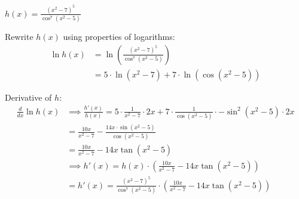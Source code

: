 \documentclass[nooutcomes]{ximera}
\renewenvironment{freeResponse}{
\ifhandout\setbox0\vbox\bgroup\else
\begin{trivlist}\item[\hskip \labelsep\bfseries Solution:\hspace{2ex}]
\fi}
{\ifhandout\egroup\else
\end{trivlist}
\fi}
\newcommand{\ddx}{\frac{d}{dx}}
\begin{document}
\begin{problem}
\begin{enumerate}
	\item  $h(x) = \frac{(x^2 - 7)^5}{\cos^7(x^2 - 5)}$
          \begin{freeResponse}
            Rewrite $h(x)$ using properties of logarithms:
            \begin{align*}
              \ln h(x) &= \ln \left( \frac{(x^2 - 7)^5}{\cos^7(x^2 - 5)}\right) \\
                       &= 5 \cdot \ln (x^2 - 7) + 7 \cdot \ln(\cos(x^2-5))
            \end{align*}

            Derivative of $h$:
            \begin{align*}
              \ddx \ln h(x) &\implies \frac{h'(x)}{h(x)} = 5 \cdot \frac{1}{x^2 - 7} \cdot 2x + 7 \cdot\frac{1}{\cos(x^2 - 5)} \cdot - \sin^2(x^2-5) \cdot 2x\\
                            &= \frac{10x}{x^2-7} - \frac{14x \cdot \sin(x^2 - 5)}{\cos(x^2 - 5)}\\
              &= \frac{10x}{x^2-7} - 14x \tan(x^2-5) \\
              &\implies h'(x) = h(x)\cdot \left( \frac{10x}{x^2-7} - 14x \tan(x^2-5) \right) \\
              &= h'(x) = \frac{(x^2 - 7)^5}{\cos^7(x^2 - 5)} \cdot \left( \frac{10x}{x^2-7} - 14x \tan(x^2-5) \right)
            \end{align*}
	\end{freeResponse}
	\end{enumerate}
\end{problem}
\end{document}
